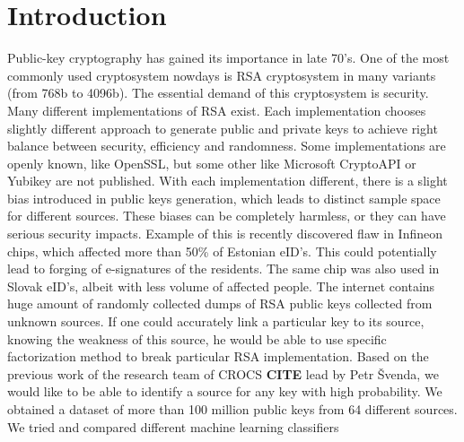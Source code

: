 \chapter*{Introduction}

Public-key cryptography has gained its importance in late 70's. One of the most commonly used cryptosystem nowdays is RSA cryptosystem in many variants (from 768b to 4096b). The essential demand of this cryptosystem is security. Many different implementations of RSA exist. Each implementation chooses slightly different approach to generate public and private keys to achieve right balance between security, efficiency and randomness. Some implementations are openly known, like OpenSSL, but some other like Microsoft CryptoAPI or Yubikey are not published. With each implementation different, there is a slight bias introduced in public keys generation, which leads to distinct sample space for different sources. These biases can be completely harmless, or they can have serious security impacts. Example of this is recently discovered flaw in Infineon chips, which affected more than 50\% of Estonian eID's. This could potentially lead to forging of e-signatures of the residents. The same chip was also used in Slovak eID's, albeit with less volume of affected people.
The internet contains huge amount of randomly collected dumps of RSA public keys collected from unknown sources. If one could accurately link a particular key to its source, knowing the weakness of this source, he would be able to use specific factorization method to break particular RSA implementation.
Based on the previous work of the research team of CROCS \textbf{CITE} lead by Petr Švenda, we would like to be able to identify a source for any key with high probability. We obtained a dataset of more than 100 million public keys from 64 different sources. We tried and compared different machine learning classifiers
